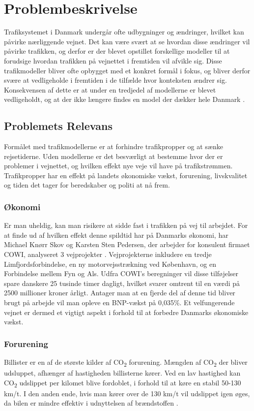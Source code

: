 \chapter{Problembeskrivelse}
Trafiksystemet i Danmark undergår ofte udbygninger og ændringer, hvilket kan påvirke nærliggende vejnet. Det kan være svært at se hvordan disse ændringer vil påvirke trafikken, og derfor er der blevet opstillet forskellige modeller til at forudsige hvordan trafikken på vejnettet i fremtiden vil afvikle sig. Disse trafikmodeller bliver ofte opbygget med et konkret formål i fokus, og bliver derfor svære at vedligeholde i fremtiden i de tilfælde hvor konteksten ændrer sig. Konsekvensen af dette er at under en tredjedel af modellerne er blevet vedligeholdt, og at der ikke længere findes en model der dækker hele Danmark \cite[s. 1-2]{dtfnotat}.
\section{Problemets Relevans}
Formålet med trafikmodellerne er at forhindre trafikpropper og at sænke rejsetiderne. Uden modellerne er det besværligt at bestemme hvor der er problemer i vejnettet, og hvilken effekt nye veje vil have på trafikstrømmen. Trafikpropper har en effekt på landets økonomiske vækst, forurening, livskvalitet og tiden det tager for beredskaber og politi at nå frem.

\subsection{Økonomi}
Er man uheldig, kan man risikere at sidde fast i trafikken på vej til arbejdet. For at finde ud af hvilken effekt denne spildtid har på Danmarks økonomi, har Michael Knørr Skov og Karsten Sten Pedersen, der arbejder for konsulent firmaet COWI, analyseret 3 vejprojekter \cite{trafikoekonomi}. Vejprojekterne inkludere en tredje Limfjordsforbindelse, en ny motorvejsstrækning ved København, og en Forbindelse mellem Fyn og Als. Udfra COWI’s beregninger vil disse tilføjelser spare danskere 25 tusinde timer dagligt, hvilket svarer omtrent til en værdi på 2500 millioner kroner årligt. Antager man at en fjerde del af denne tid bliver brugt på arbejde vil man opleve en BNP-vækst på 0,035\%. Et velfungerende vejnet er dermed et vigtigt aspekt i forhold til at forbedre Danmarks økonomiske vækst.

\subsection{Forurening}
Billister er en af de største kilder af CO\textsubscript{2} forurening. Mængden af CO\textsubscript{2} der bliver udsluppet, afhænger af hastigheden billisterne kører. Ved en lav hastighed kan CO\textsubscript{2} udslippet per kilomet blive fordoblet, i forhold til at køre en stabil 50-130 km/t. I den anden ende, hvis man kører over de 130 km/t vil udslippet igen øges, da bilen er mindre effektiv i udnyttelsen af brændstoffen \cite[s. 5-6]{forurening}.

